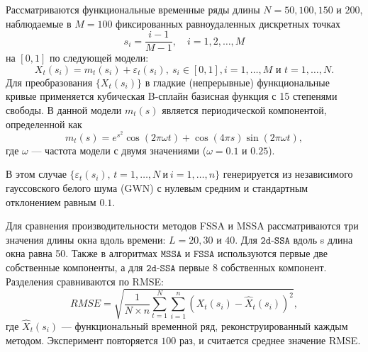 \documentclass[12pt, specialist, subf
]{disser}
\theoremstyle{definition}
\newcommand{\MSSA}{\texttt{MSSA}}
\newcommand{\FSSA}{\texttt{FSSA}}
\newcommand{\DSSA}{\texttt{2d-SSA}}
\begin{document}
Рассматриваются функциональные временные ряды длины $N=50, 100, 150$ и $200$, наблюдаемые в $M=100$ фиксированных равноудаленных дискретных точках \[
s_i = \frac{i - 1}{M - 1}, \quad i = 1, 2, \dots, M
\] на $[0,1]$ по следующей модели:
\begin{equation}\label{eq:mainmodel}
	X_t\left(s_i\right)=m_t(s_i)+\varepsilon_t\left(s_i\right),\ s_i \in [0,1], i=1,\ldots,M \text{ и } t=1, \dots, N.
\end{equation}
Для преобразования $\{X_t(s_i)\}$ в гладкие (непрерывные) функциональные кривые применяется кубическая B-сплайн базисная функция с 15 степенями свободы. В данной модели $m_t(s)$ является периодической компонентой, определенной как
\begin{equation}\label{eq:Trend}
	m_t(s)=e^{s^2} \cos\left(2\pi \omega t\right)+\cos(4\pi s) \sin\left(2\pi \omega t\right),
\end{equation}
где $\omega$ — частота модели с двумя значениями ($\omega=0.1$ и $0.25$).

В этом случае $\{\varepsilon_t(s_i), \, t=1,\ldots, N\ \text{и}\ i=1,\ldots,n \}$ генерируется из независимого гауссовского белого шума (GWN) с нулевым средним и стандартным отклонением равным $0.1$.

Для сравнения производительности методов FSSA и MSSA рассматриваются три значения длины окна вдоль времени: $L=20, 30$ и $40$. Для $\DSSA$ вдоль s длина окна равна 50. Также в алгоритмах $\MSSA$ и $\FSSA$ используются первые две собственные компоненты, а для $\DSSA$ первые 8 собственных компонент. Разделения сравниваются по RMSE:
\[RMSE= \sqrt {\frac{1}{N\times n}\sum\limits_{t=1}^N \sum_{i=1}^n \left(X_t(s_i)-\hat{X}_t(s_i)\right)^2},\]
где $\hat{X}_t(s_i)$ — функциональный временной ряд, реконструированный каждым методом. Эксперимент повторяется $100$ раз, и считается среднее значение RMSE.
\end{document}
